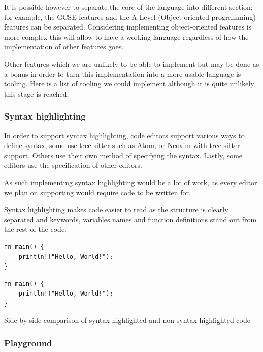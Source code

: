\documentclass{article}
\begin{document}
It is possible however to separate the core of the language into different
section; for example, the GCSE features and the A Level (Object-oriented
programming) features can be separated. Considering implementing
object-oriented features is more complex this will allow to have a working
language regardless of how the implementation of other features goes.

Other features which we are unlikely to be able to implement but may be done as
a bonus in order to turn this implementation into a more usable language is
tooling. Here is a list of tooling we could implement although it is quite
unlikely this stage is reached.

\subsubsection{Syntax highlighting}

In order to support syntax highlighting, code editors support various ways to
define syntax, some use tree-sitter such as Atom, or Neovim with tree-sitter
support. Others use their own method of specifying the syntax. Lastly, some
editors use the specification of other editors.

As such implementing syntax highlighting would be a lot of work, as every
editor we plan on supporting would require code to be written for.

Syntax highlighting makes code easier to read as the structure is clearly
separated and keywords, variables names and function definitions stand out from
the rest of the code.

\begin{listing}
	\centering
	\begin{minipage}{.5\textwidth}
		\centering
		\begin{verbatim}
fn main() {
    println!("Hello, World!");
}
		\end{verbatim}
	\end{minipage}%
	\begin{minipage}{.5\textwidth}
		\centering
		\begin{verbatim}
fn main() {
    println!("Hello, World!");
}
		\end{verbatim}
	\end{minipage}

	\caption{Side-by-side comparison of syntax highlighted and non-syntax
	highlighted code}
\end{listing}

\subsubsection{Playground}
\end{document}
